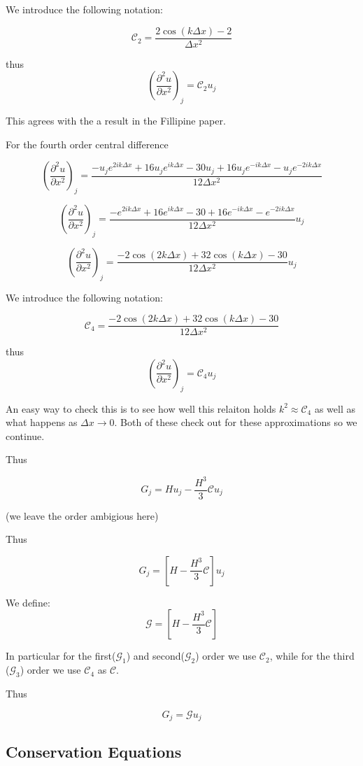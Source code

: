 \documentclass[12pt]{article}
\begin{document}
We introduce the following notation:

\[\mathcal{C}_2 = \frac{ 2\cos\left(k\Delta x\right) - 2 }{\Delta x^2}\]

thus 
\[ \left(\frac{\partial^2 u}{\partial x^2}\right)_j = \mathcal{C}_2 u_{j}\]

This agrees with the a result in the Fillipine paper.

For the fourth order central difference 

\[ \left(\frac{\partial^2 u}{\partial x^2}\right)_j = \frac{-u_{j}e^{2ik\Delta x}  + 16u_{j}e^{ik\Delta x}  - 30u_{j} + 16u_{j}e^{-ik\Delta x}  -u_{j}e^{-2ik\Delta x} }{12\Delta x^2}\]

\[ \left(\frac{\partial^2 u}{\partial x^2}\right)_j = \frac{-e^{2ik\Delta x}  + 16e^{ik\Delta x}  - 30 + 16e^{-ik\Delta x}  -e^{-2ik\Delta x} }{12\Delta x^2} u_{j}\]

\[ \left(\frac{\partial^2 u}{\partial x^2}\right)_j = \frac{-2\cos\left(2k\Delta x\right) + 32\cos\left(k\Delta x\right)  - 30 }{12\Delta x^2} u_{j}\]

We introduce the following notation:

\[\mathcal{C}_4 = \frac{-2\cos\left(2k\Delta x\right) + 32\cos\left(k\Delta x\right)  - 30 }{12\Delta x^2}\]

thus 
\[ \left(\frac{\partial^2 u}{\partial x^2}\right)_j = \mathcal{C}_4 u_{j}\]

An easy way to check this is to see how well this relaiton holds $k^2 \approx \mathcal{C}_4 $ as well as what happens as $\Delta x \rightarrow 0$. Both of these check out for these approximations so we continue. 

Thus

\[G_j = Hu_j -\frac{H^3}{3} \mathcal{C}u_j\]

(we leave the order ambigious here)

Thus 

\[G_j = \left[H -\frac{H^3}{3} \mathcal{C}\right]u_j\]

We define:
\[\mathcal{G} = \left[H -\frac{H^3}{3} \mathcal{C}\right]\]

In particular for the first($\mathcal{G}_1$) and second($\mathcal{G}_2$) order we use $\mathcal{C}_2$, while for the third ($\mathcal{G}_3$) order we use $\mathcal{C}_4$ as $\mathcal{C}$.

Thus 

\[G_j = \mathcal{G}u_j\]

\subsection{Conservation Equations}
\end{document}
